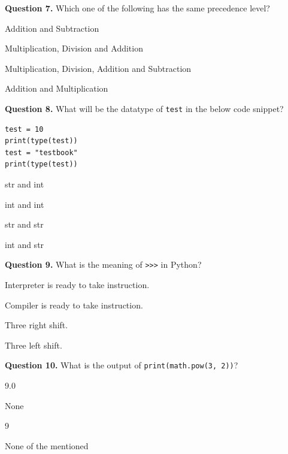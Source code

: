 \documentclass[11pt,a4paper]{article}
\begin{document}
\medskip


\noindent   \textbf{Question 7.} Which one of the following has the same precedence level?

\begin{parts}
  \item Addition and Subtraction
  \item Multiplication, Division and Addition
  \item Multiplication, Division, Addition and Subtraction
  \item Addition and Multiplication
\end{parts}

\medskip


\noindent   \textbf{Question 8.} What will be the datatype of   \texttt{test} in the below code snippet?

\begin{lstlisting}
test = 10
print(type(test))
test = "testbook"
print(type(test))
\end{lstlisting}

\begin{parts}
  \item str and int
  \item int and int
  \item str and str
  \item int and str
\end{parts}

\medskip


\noindent   \textbf{Question 9.} What is the meaning of   \texttt{>>>} in Python?

\begin{parts}
  \item Interpreter is ready to take instruction.
  \item Compiler is ready to take instruction.
  \item Three right shift.
  \item Three left shift.
\end{parts}

\medskip


\noindent   \textbf{Question 10.} What is the output of   \texttt{print(math.pow(3, 2))}?

\begin{parts}
  \item 9.0
  \item None
  \item 9
  \item None of the mentioned
\end{parts}
\end{document}
